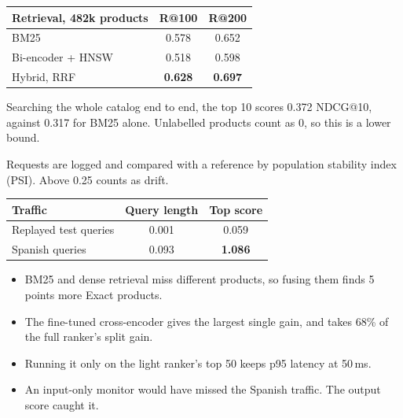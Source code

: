 \documentclass[12pt]{article}
\newlength{\colh}\setlength{\colh}{31cm}
\newcommand{\firsthead}[1]{{\Large\bfseries\color{accent}#1}\par\vspace{2pt}}
\newcommand{\head}[1]{\vspace{10pt plus 1fil}\firsthead{#1}}
\begin{document}
\begin{minipage}[t][\colh][s]{0.31\textwidth}
\begin{center}
\begin{tabular}{lcc}
\toprule
Retrieval, 482k products & R@100 & R@200 \\
\midrule
BM25 & 0.578 & 0.652 \\
Bi-encoder + HNSW & 0.518 & 0.598 \\
Hybrid, RRF & \textbf{0.628} & \textbf{0.697} \\
\bottomrule
\end{tabular}
\end{center}

Searching the whole catalog end to end, the top 10 scores 0.372 NDCG@10, against 0.317 for BM25 alone.
Unlabelled products count as 0, so this is a lower bound.

\head{Monitoring}
Requests are logged and compared with a reference by population stability index (PSI).
Above 0.25 counts as drift.

\begin{center}
\begin{tabular}{lcc}
\toprule
Traffic & Query length & Top score \\
\midrule
Replayed test queries & 0.001 & 0.059 \\
Spanish queries & 0.093 & \textbf{1.086} \\
\bottomrule
\end{tabular}
\end{center}

\head{Summary}
\begin{itemize}
  \item BM25 and dense retrieval miss different products, so fusing them finds 5 points more Exact products.
  \item The fine-tuned cross-encoder gives the largest single gain, and takes 68\% of the full ranker's split gain.
  \item Running it only on the light ranker's top 50 keeps p95 latency at 50\,ms.
  \item An input-only monitor would have missed the Spanish traffic. The output score caught it.
\end{itemize}
\end{minipage}
\end{document}
